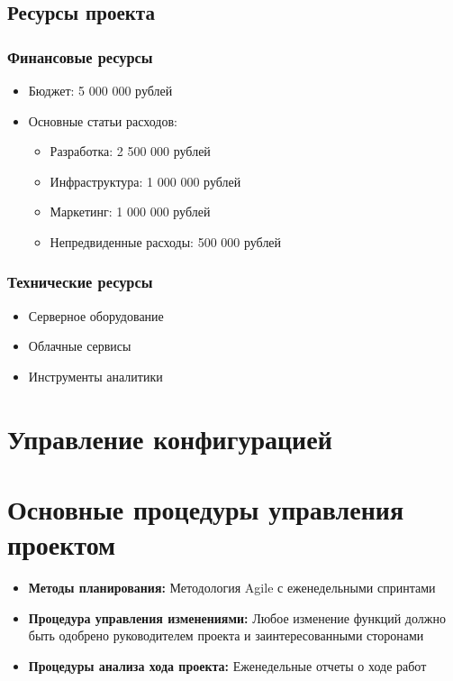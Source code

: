 \documentclass[14pt, russian]{matmex-diploma-custom}
\begin{document}
\subsection{Ресурсы проекта}
\subsubsection{Финансовые ресурсы}
\begin{itemize}
\item Бюджет: 5 000 000 рублей
\item Основные статьи расходов:
\begin{itemize}
\item Разработка: 2 500 000 рублей
\item Инфраструктура: 1 000 000 рублей
\item Маркетинг: 1 000 000 рублей
\item Непредвиденные расходы: 500 000 рублей
\end{itemize}
\end{itemize}

\subsubsection{Технические ресурсы}
\begin{itemize}
\item Серверное оборудование
\item Облачные сервисы
\item Инструменты аналитики
\end{itemize}

\section{Управление конфигурацией}

\section{Основные процедуры управления проектом}
\begin{itemize}
    \item \textbf{Методы планирования:} Методология Agile с еженедельными спринтами
    \item \textbf{Процедура управления изменениями:} Любое изменение функций должно быть одобрено руководителем проекта и заинтересованными сторонами
    \item \textbf{Процедуры анализа хода проекта:} Еженедельные отчеты о ходе работ
\end{itemize}
\end{document}
